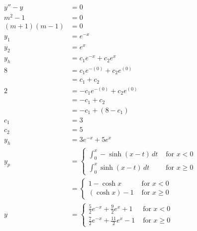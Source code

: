 \documentclass{article}
\begin{document}
\begin{align*}
  y'' - y         & = 0                                                                \\
  m^2 - 1         & = 0                                                                \\
  (m + 1) (m - 1) & = 0                                                                \\
  y_1             & = e^{-x}                                                           \\
  y_2             & = e^x                                                              \\
  y_h             & = c_1 e^{-x} + c_2 e^x                                             \\
  8               & = c_1 e^{-(0)} + c_2 e^{(0)}                                       \\
                  & = c_1 + c_2                                                        \\
  2               & = -c_1 e^{-(0)} + c_2 e^{(0)}                                      \\
                  & = -c_1 + c_2                                                       \\
                  & = -c_1 + (8 - c_1)                                                 \\
  c_1             & = 3                                                                \\
  c_2             & = 5                                                                \\
  y_h             & = 3 e^{-x} + 5 e^x                                                 \\
  y_p             & = \begin{cases}
                        \int_0^x -\sinh (x - t) \,dt & \text{ for } x < 0   \\
                        \int_0^x \sinh (x - t) \,dt  & \text{ for } x \ge 0
                      \end{cases}              \\
                  & = \begin{cases}
                        1 - \cosh x   & \text{ for } x < 0   \\
                        (\cosh x) - 1 & \text{ for } x \ge 0
                      \end{cases}                             \\
  y               & = \begin{cases}
                        \frac{5}{2} e^{-x} + \frac{9}{2} e^x + 1  & \text{ for } x < 0   \\
                        \frac{7}{2} e^{-x} + \frac{11}{2} e^x - 1 & \text{ for } x \ge 0
                      \end{cases}
\end{align*}
\end{document}
